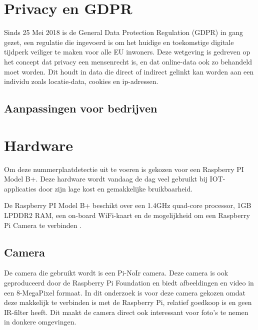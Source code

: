 \section{Privacy en GDPR}
\label{sec:privacy-en-gdpr}

Sinds 25 Mei 2018 is de General Data Protection Regulation (GDPR) in gang gezet, een regulatie die ingevoerd is om het huidige  en toekomstige digitale tijdperk veiliger te maken voor alle EU inwoners.
Deze wetgeving is gedreven op het concept dat privacy een mensenrecht is, en dat online-data ook zo behandeld moet worden. Dit houdt in data die direct of indirect gelinkt kan worden aan een individu zoals locatie-data, cookies en ip-adressen.\autocite{goddard2017eu}

\subsection{Aanpassingen voor bedrijven}


\section{Hardware}
Om deze nummerplaatdetectie uit te voeren is gekozen voor een Raspberry PI Model B+. Deze hardware wordt vandaag de dag veel gebruikt bij IOT-applicaties door zijn lage kost en gemakkelijke bruikbaarheid.  

De Raspberry PI Model B+ beschikt over een 1.4GHz quad-core processor, 1GB LPDDR2 RAM, een on-board WiFi-kaart en de mogelijkheid om een Raspberry Pi Camera te verbinden \autocite{raspberrypisitemodelbplus} .

\subsection{Camera}
De camera die gebruikt wordt is een Pi-NoIr camera. Deze camera is ook geproduceerd door de Raspberry Pi Foundation en biedt afbeeldingen en video in een 8-MegaPixel formaat. In dit onderzoek is voor deze camera gekozen omdat deze makkelijk te verbinden is met de Raspberry Pi, relatief goedkoop is en geen IR-filter heeft. Dit maakt de camera direct ook interessant voor foto's te nemen in donkere omgevingen. \autocite{raspberrypisitemodelpinoir}